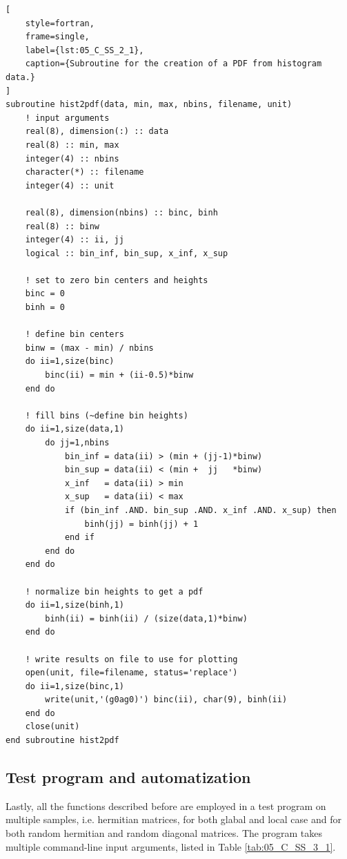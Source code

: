\documentclass[pra, onecolumn, notitlepage, floats, 11pt]{revtex4-1}
\begin{document}
\medskip
\begin{lstlisting}[
    style=fortran,
    frame=single,
    label={lst:05_C_SS_2_1},
    caption={Subroutine for the creation of a PDF from histogram data.}
]
subroutine hist2pdf(data, min, max, nbins, filename, unit)
    ! input arguments
    real(8), dimension(:) :: data
    real(8) :: min, max
    integer(4) :: nbins
    character(*) :: filename
    integer(4) :: unit

    real(8), dimension(nbins) :: binc, binh
    real(8) :: binw
    integer(4) :: ii, jj
    logical :: bin_inf, bin_sup, x_inf, x_sup

    ! set to zero bin centers and heights
    binc = 0
    binh = 0

    ! define bin centers
    binw = (max - min) / nbins
    do ii=1,size(binc)
        binc(ii) = min + (ii-0.5)*binw
    end do

    ! fill bins (~define bin heights)
    do ii=1,size(data,1)
        do jj=1,nbins
            bin_inf = data(ii) > (min + (jj-1)*binw)
            bin_sup = data(ii) < (min +  jj   *binw)
            x_inf   = data(ii) > min
            x_sup   = data(ii) < max
            if (bin_inf .AND. bin_sup .AND. x_inf .AND. x_sup) then
                binh(jj) = binh(jj) + 1
            end if
        end do
    end do

    ! normalize bin heights to get a pdf
    do ii=1,size(binh,1)
        binh(ii) = binh(ii) / (size(data,1)*binw)
    end do

    ! write results on file to use for plotting
    open(unit, file=filename, status='replace')
    do ii=1,size(binc,1)
        write(unit,'(g0ag0)') binc(ii), char(9), binh(ii)
    end do
    close(unit)
end subroutine hist2pdf
\end{lstlisting}



\subsection{Test program and automatization}
Lastly, all the functions described before are employed in a test program on multiple samples, i.e. hermitian matrices, for both glabal and local case and for both random hermitian and random diagonal matrices. The program takes multiple command-line input arguments, listed in Table \ref{tab:05_C_SS_3_1}.
\end{document}
